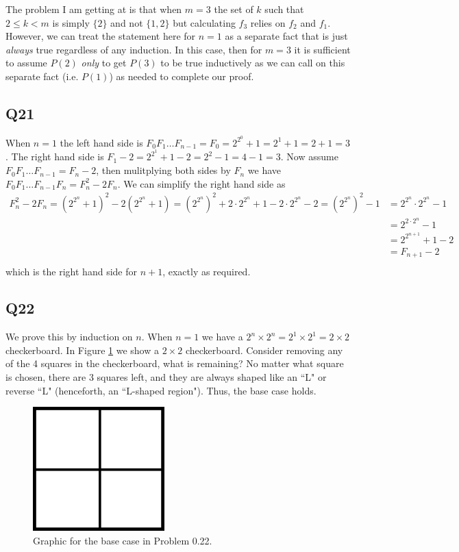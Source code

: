 \documentclass[12pt]{article}
\numberwithin{theorem}{section}
\numberwithin{equation}{section}
\numberwithin{remark}{section}
\numberwithin{definition}{section}
\numberwithin{theorem}{section}
\numberwithin{lemma}{section}
\numberwithin{example}{section}
\begin{document}
The problem I am getting at is that when $m=3$ the set of $k$ such that $2\le k < m$ is simply $\{2\}$ and not $\{1,2\}$ but calculating $f_3$ relies on $f_2$ and $f_1$. However, we can treat the statement here for $n=1$ as a separate fact that is just \emph{always} true regardless of any induction. In this case, then for $m=3$ it is sufficient to assume $P(2)$ \emph{only} to get $P(3)$ to be true inductively as we can call on this separate fact (i.e. $P(1)$) as needed to complete our proof. 



\subsection{Q21}

When $n=1$ the left hand side is $F_0F_1\ldots F_{n-1}=F_0=2^{2^0}+1=2^1+1=2+1=3$. The right hand side is $F_1 - 2 = 2^{2^{1}}+1-2=2^2-1=4-1=3$. Now assume $F_0F_1\ldots F_{n-1}=F_n-2$, then mulitplying both sides by $F_n$ we have $F_0F_1\ldots F_{n-1}F_n=F_n^2-2F_n$. We can simplify the right hand side as 
\begin{align*}
	F_n^2-2F_n = \left(2^{2^n}+1\right)^2-2\left(2^{2^n}+1\right)=\left(2^{2^n}\right)^2+2\cdot 2^{2^n}+1-2\cdot 2^{2^n} - 2 = \left(2^{2^n}\right)^2-1 & = 2^{2^n}\cdot 2^{2^n}-1\\
	& = 2^{2\cdot2^n}-1\\
	& = 2^{2^{n+1}}+1-2\\
	& = F_{n+1}-2\\
\end{align*}
which is the right hand side for $n+1$, exactly as required. 



\subsection{Q22}

We prove this by induction on $n$. When $n=1$ we have a $2^{n}\times2^{n}=2^{1}\times2^1=2\times2$ checkerboard. In Figure \ref{fig:problem_0.22_0} we show a $2\times2$ checkerboard. Consider removing any of the 4 squares in the checkerboard, what is remaining? No matter what square is chosen, there are 3 squares left, and they are always shaped like an ``L" or reverse ``L" (henceforth, an ``L-shaped region"). Thus, the base case holds. 

\begin{figure}
	\begin{center}
		\includegraphics[width=2in]{fig/problem_0.22_0.png}
		\caption{Graphic for the base case in Problem 0.22.}
		\label{fig:problem_0.22_0}
	\end{center}
\end{figure}
\end{document}
